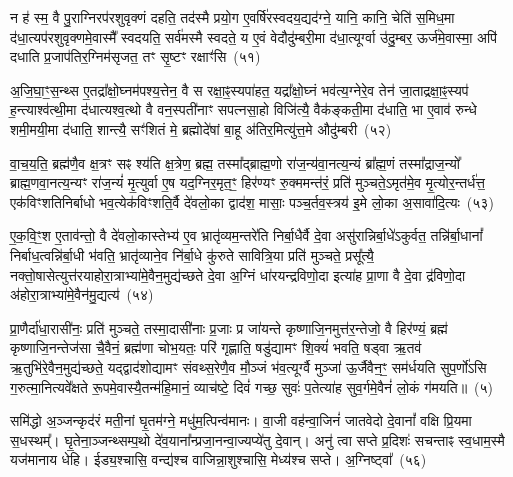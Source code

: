 {}%

न ह॑ स्म॒ वै पु॒राग्निरप॑रशुवृक्णं दहति॒ तद॑स्मै प्रयो॒ग ए॒वर्\mbox{}षि॑रस्वदय॒द्यद॑ग्ने॒ यानि॒ कानि॒ चेति॑ स॒मिध॒मा द॑धा॒त्यप॑रशुवृक्णमे॒वास्मै᳚ स्वदयति॒ सर्व॑मस्मै स्वदते॒ य ए॒वं वेदौदु॑म्बरी॒मा द॑धा॒त्यूर्ग्वा उ॑दु॒म्बर॒ ऊर्ज॑मे॒वास्मा॒ अपि॑ दधाति प्र॒जा\-प॑तिर॒ग्निम॑सृजत॒ तꣳ सृ॒ष्टꣳ रक्षाꣳ॑सि~(५१)

अ॒जि॒घा॒ꣳ॒स॒न्थ्स ए॒तद्रा᳚क्षो॒घ्नम॑पश्य॒त्तेन॒ वै स रक्षा॒ꣴ॒स्यपा॑हत॒ यद्रा᳚क्षो॒घ्नं भव॑त्य॒ग्नेरे॒व तेन॑ जा॒ताद्रक्षा॒ꣴ॒स्यप॑ ह॒न्त्याश्व॑त्थी॒मा द॑धात्यश्व॒त्थो वै वन॒स्पती॑नाꣳ सपत्नसा॒हो विजि॑त्यै॒ वैक॑ङ्कती॒मा द॑धाति॒ भा ए॒वाव॑ रुन्धे शमी॒मयी॒मा द॑धाति॒ शान्त्यै॒ सꣳ॑शितं मे॒ ब्रह्मोदे॑षां बा॒हू अ॑तिर॒मित्यु॑त्त॒मे औदु॑म्बरी~(५२)

वा॒च॒य॒ति॒ ब्रह्म॑णै॒व क्ष॒त्रꣳ सꣴ श्य॑ति क्ष॒त्रेण॒ ब्रह्म॒ तस्मा᳚द्ब्राह्म॒णो रा॑ज॒न्य॑वा॒नत्य॒न्यं ब्रा᳚ह्म॒णं तस्मा᳚द्राज॒न्यो᳚ ब्राह्म॒णवा॒नत्य॒न्यꣳ रा॑ज॒न्यं॑ मृ॒त्युर्वा ए॒ष यद॒ग्निर॒मृत॒ꣳ॒ हिर॑ण्यꣳ रु॒क्ममन्त॑रं॒ प्रति॑ मुञ्चते॒\-ऽमृत॑मे॒व मृ॒त्योर॒न्तर्ध॑त्त॒ एक॑विꣳशतिनिर्बाधो भव॒त्येक॑विꣳशति॒र्वै दे॑वलो॒का द्वाद॑श॒ मासाः॒ पञ्च॒र्तव॒स्त्रय॑ इ॒मे लो॒का अ॒सावा॑दि॒त्यः~(५३)

ए॒क॒वि॒ꣳ॒श ए॒ताव॑न्तो॒ वै दे॑वलो॒कास्तेभ्य॑ ए॒व भ्रातृ॑व्यम॒न्तरे॑ति निर्बा॒धैर्वै दे॒वा असु॑रान्निर्बा॒धे॑\-ऽकुर्वत॒ तन्नि॑र्बा॒धानां᳚ निर्बाध॒त्वन्नि॑र्बा॒धी भ॑वति॒ भ्रातृ॑व्याने॒व नि॑र्बा॒धे कु॑रुते सावित्रि॒या प्रति॑ मुञ्चते॒ प्रसू᳚त्यै॒ नक्तो॒षासेत्युत्त॑रयाहोरा॒त्राभ्या॑\-मे॒वैन॒मुद्य॑च्छते दे॒वा अ॒ग्निं धा॑रयन्द्रविणो॒दा इत्या॑ह प्रा॒णा वै दे॒वा द्र॑विणो॒दा अ॑होरा॒त्राभ्या॑मे॒वैन॑मु॒द्यत्य॑~(५४)

प्रा॒णैर्दा॑धा॒रासी॑नः॒ प्रति॑ मुञ्चते॒ तस्मा॒दासी॑नाः प्र॒जाः प्र जा॑यन्ते कृष्णाजि॒नमुत्त॑र॒न्तेजो॒ वै हिर॑ण्यं॒ ब्रह्म॑ कृष्णाजि॒नन्तेज॑सा चै॒वैनं॒ ब्रह्म॑णा चोभ॒यतः॒ परि॑ गृह्णाति॒ षडु॑द्यामꣳ शि॒क्यं॑ भवति॒ षड्वा ऋ॒तव॑ ऋ॒तुभि॑रे॒वैन॒मुद्य॑च्छते॒ यद्द्वाद॑शोद्यामꣳ संवथ्स॒रेणै॒व मौ॒ञ्जं भ॑व॒त्यूर्ग्वै मुञ्जा॑ ऊ॒र्जैवैन॒ꣳ॒ सम॑र्धयति सुप॒र्णो॑\-ऽसि ग॒रुत्मा॒नित्यवे᳚क्षते रू॒पमे॒वास्यै॒तन्म॑हि॒मानं॒ व्याच॑ष्टे॒ दिवं॑ गच्छ॒ सुवः॑ प॒तेत्या॑ह सुव॒र्गमे॒वैनं॑ लो॒कं ग॑मयति॥~(५)

{\anuvakamend[{रक्षा॒ꣴ॒स्यौदु॑म्बरी आदि॒त्य उ॒द्यत्य॒ स़ञ्चतु॑र्विꣳशतिश्च}]}%

समि॑द्धो अ॒ञ्जन्कृद॑रं मती॒नां घृ॒तम॑ग्ने॒ मधु॑म॒त्पिन्व॑मानः। वा॒जी वह॑न्वा॒जिनं॑ जातवेदो दे॒वानां᳚ वक्षि प्रि॒यमा स॒धस्थम्᳚। घृ॒तेना॒ञ्जन्थ्सम्प॒थो दे॑व॒याना᳚न्प्रजा॒नन्वा॒ज्यप्ये॑तु दे॒वान्। अनु॑ त्वा सप्ते प्र॒दिशः॑ सचन्ताꣴ स्व॒धाम॒स्मै यज॑मानाय धेहि। ईड्य॒श्चासि॒ वन्द्य॑श्च वाजिन्ना॒शुश्चासि॒ मेध्य॑श्च सप्ते। अ॒ग्निष्ट्वा᳚~(५६)


